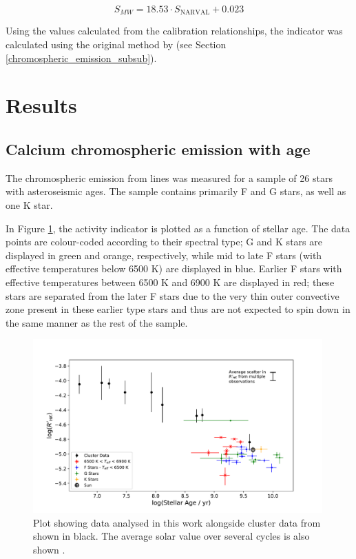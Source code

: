 \begin{equation}
S_{MW} = 18.53 \cdot S_{\mathrm{NARVAL}} + 0.023
\label{Eq:nar_calibrator_eq}
\end{equation} 

Using the \Smw values calculated from the calibration relationships, the \Rprime indicator was calculated using the original method by \citet{Noyes_etal_1984} (see Section \ref{chromospheric_emission_subsub}).

\section{Results}
\label{Chp4_results}

\subsection{Calcium chromospheric emission with age}
The chromospheric emission from \caII lines was measured for a sample of 26 stars with asteroseismic ages. The sample contains primarily F and G stars, as well as one K star.

In Figure \ref{fig:calcium_emission_plot}, the \Rprime activity indicator is plotted as a function of stellar age. The data points are colour-coded according to their spectral type; G and K stars are displayed in green and orange, respectively, while mid to late F stars (with effective temperatures below 6500 K) are displayed in blue. Earlier F stars with effective temperatures between 6500 K and 6900 K are displayed in red; these stars are separated from the later F stars due to the very thin outer convective zone present in these earlier type stars and thus are not expected to spin down in the same manner as the rest of the sample.

\begin{figure}[h]
	\includegraphics[width=0.99\textwidth]{Figures/4-Chromospheric_age/ca_results_with_clusters.pdf}
	\caption{Plot showing data analysed in this work alongside cluster data from \citet{Mamajek_Hillenbrand_2008} shown in black. The average solar value over several cycles is also shown \citep{Egeland_etal_2017}.}
	\centering
	\label{fig:calcium_emission_plot}
\end{figure}

